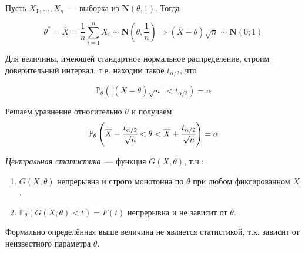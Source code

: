 \begin{exmp}
Пусть $X_1, \ldots, X_n$~--- выборка из $\mathbf{N}(\theta, 1)$. Тогда

\begin{equation*}
    \theta^{*}
    = \overline{X}
    = \frac{1}{n} \sum\limits_{i=1}^{n} X_{i} \sim \mathbf{N}\left(\theta, \frac{1}{n}\right)
    \Rightarrow (\overline{X}-\theta) \sqrt{n} \sim \mathbf{N}(0;1)
\end{equation*}

Для величины, имеющей стандартное нормальное распределение, строим доверительный интервал, т.е. находим такое $t_{\alpha / 2}$, что 

\begin{equation*}
    \mathbb{P}_{\theta}\left(|(\overline{X}-\theta) \sqrt{n}|<t_{\alpha / 2}\right)=\alpha
\end{equation*}

Решаем уравнение относительно $\theta$ и получаем
\begin{equation*}
    \mathbb{P}_{\theta}\left(\overline{X}-\cfrac{t_{\alpha / 2}}{\sqrt{n}}<\theta<\overline{X}+\cfrac{t_{\alpha / 2}}{\sqrt{n}}\right)=\alpha 
\end{equation*}

\end{exmp}

\begin{defn}
{\it Центральная статистика}~--- функция $G(X,\theta)$, т.ч.:
\begin{enumerate}
    \item $G(X,\theta)$ непрерывна и строго монотонна по $\theta$ при любом фиксированном $X$.
    \item $\mathbb{P}_{\theta}(G(X, \theta)<t)=F(t)$ непрерывна и не зависит от $\theta$.
\end{enumerate}
\end{defn}

\begin{rmrk}
Формально определённая выше величина не является статистикой, т.к. зависит от неизвестного параметра $\theta$.
\end{rmrk}

